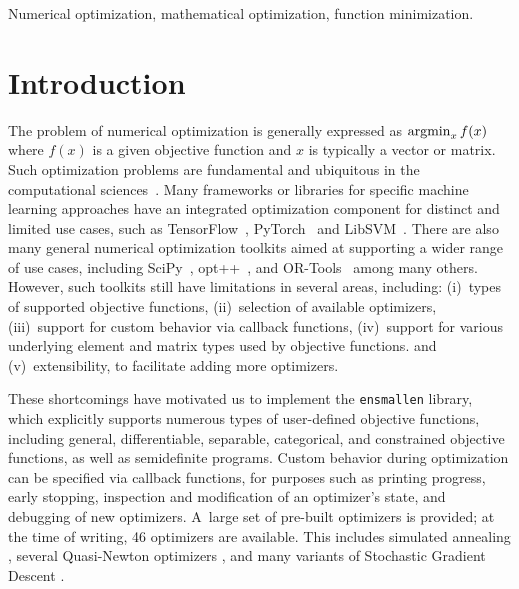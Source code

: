 \documentclass[twoside,11pt]{article}
\begin{document}
\begin{keywords}
  Numerical optimization, mathematical optimization, function minimization.
\end{keywords}


\section{Introduction}

The problem of numerical optimization is generally expressed as
$\operatornamewithlimits{argmin}_x f(x)$
where $f(x)$ is a given objective function and $x$ is typically a vector or matrix.
Such optimization problems are fundamental and ubiquitous in the computational sciences~\citep{Nocedal_2006}.
Many frameworks or libraries for specific machine learning approaches
have an integrated optimization component for distinct and limited use cases,
such as
TensorFlow~\citep{TensorFlow_arXiv_2016},
PyTorch~\citep{PyTorch_NeurIPS_2019}
and LibSVM~\citep{libsvm2011}.
There are also many general numerical optimization toolkits
aimed at supporting a wider range of use cases,
including SciPy~\citep{SciPy_arXiv_2019},
opt++~\citep{meza1994opt++},
and 
OR-Tools~\citep{ortools} among many others.
However, such toolkits still have limitations in several areas,
including:
(i)~types of supported objective functions,
(ii)~selection of available optimizers,
(iii)~support for custom behavior via callback functions,
(iv)~support for various underlying element and matrix types used by objective functions.
and
(v)~extensibility, to facilitate adding more optimizers.

These shortcomings have motivated us to implement the {\tt ensmallen} library,
which explicitly supports numerous types of user-defined objective functions,
including general, differentiable, separable, categorical, and constrained
objective functions, as well as semidefinite programs.
Custom behavior during optimization can be specified via {callback} functions,
for purposes such as printing progress, early stopping, inspection and modification of an optimizer's state,
and debugging of new optimizers.
A~large set of pre-built optimizers is provided;
at the time of writing, 46 optimizers are available.
This includes 
simulated annealing \citep{kirkpatrick1983optimization},
several Quasi-Newton optimizers \citep{liu1989limited,mokhtari2018},
and many variants of Stochastic Gradient Descent \citep{Ruder_2016}.
\end{document}
